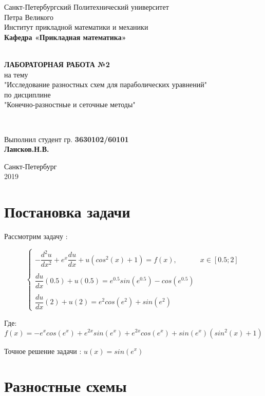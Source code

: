 \documentclass[12pt]{article}
\renewcommand{\listoffigures}{\begingroup  %
\tocsection
\tocfile{\listfigurename}{lof}
\endgroup}
\renewcommand{\listoftables}{\begingroup  %
\tocsection
\tocfile{\listtablename}{lot}
\endgroup}
\begin{document}
\begin{titlepage}
	\center
		Санкт-Петербургский Политехнический 
		университет \\ Петра Великого\\
		Институт прикладной математики и механики
		\\ \textbf{Кафедра «Прикладная математика»}

	\vfill ~
	\textbf{
		\\ \large ЛАБОРАТОРНАЯ РАБОТА №2
	}
	\\	на тему 
	\\ "Исследование разностных схем для параболических уравнений"
	\\ по дисциплине
	\\ "Конечно-разностные и сеточные методы"

	\vfill ~

	Выполнил студент гр. \textbf{3630102/60101} \\
	\textbf{Лансков.Н.В.} \\ 

\vfill

{\large}	Санкт-Петербург
\\ 2019
\end{titlepage}


\tableofcontents 
\newpage
\listoffigures
\newpage
\listoftables
\newpage

\section{Постановка задачи}

Рассмотрим задачу :

$$
\begin{cases}
-\dfrac{d^2u}{dx^2} + e^x\dfrac{du}{dx} + u(cos^2(x) + 1) = f(x), & x \in [0.5;2] \\ \\
\dfrac{du}{dx}(0.5) + u(0.5) = e^{0.5}sin(e^{0.5}) - cos(e^{0.5}) \\ \\
\dfrac{du}{dx}(2) + u(2) = e^2cos(e^2) + sin(e^2)
\end{cases}
$$

Где:
$$
f(x) = -e^xcos(e^x) + e^{2x}sin(e^x) + e^{2x}cos(e^x) + sin(e^x)(sin^2(x) + 1)
$$

Точное решение задачи : $u(x) = sin(e^x)$ 
\section{Разностные схемы}
\end{document}
